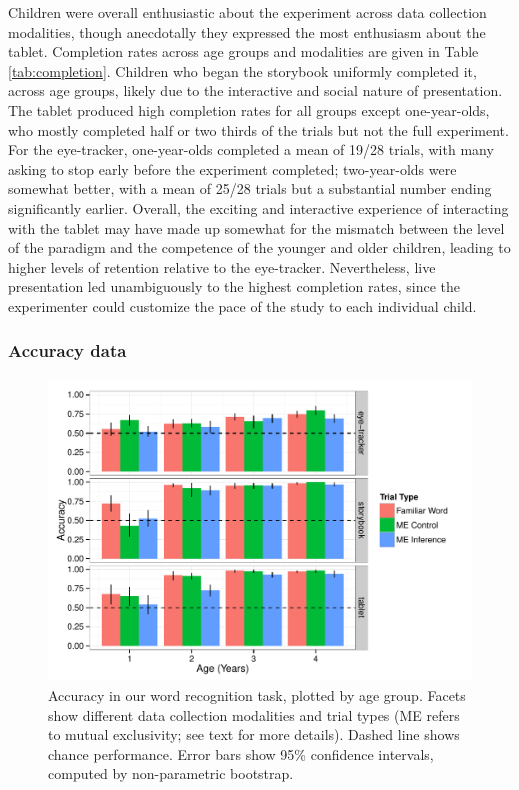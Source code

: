 \documentclass[man,noapacite]{apa2}
\begin{document}
Children were overall enthusiastic about the experiment across data collection modalities, though anecdotally they expressed the most enthusiasm about the tablet. Completion rates across age groups and modalities are given in Table \ref{tab:completion}. Children who began the storybook uniformly completed it, across age groups, likely due to the interactive and social nature of presentation. The tablet produced high completion rates for all groups except one-year-olds, who mostly completed half or two thirds of the trials but not the full experiment. For the eye-tracker, one-year-olds completed a mean of 19/28 trials, with many asking to stop early before the experiment completed; two-year-olds were somewhat better, with a mean of 25/28 trials but a substantial number ending significantly earlier. Overall, the exciting and interactive experience of interacting with the tablet may have made up somewhat for the mismatch between the level of the paradigm and the competence of the younger and older children, leading to higher levels of retention relative to the eye-tracker. Nevertheless, live presentation led unambiguously to the highest completion rates, since the experimenter could customize the pace of the study to each individual child.

\subsubsection{Accuracy data} 

\begin{figure}[t] 
  \begin{center} 
    \includegraphics[width=5in]{figures/accuracy.pdf} 
    \caption{\label{fig:accuracy} Accuracy in our word recognition task, plotted by age group. Facets show different data collection modalities and trial types (ME refers to mutual exclusivity; see text for more details). Dashed line shows chance performance. Error bars show 95\% confidence intervals, computed by non-parametric bootstrap. }
  \end{center} 
\end{figure}
\end{document}
